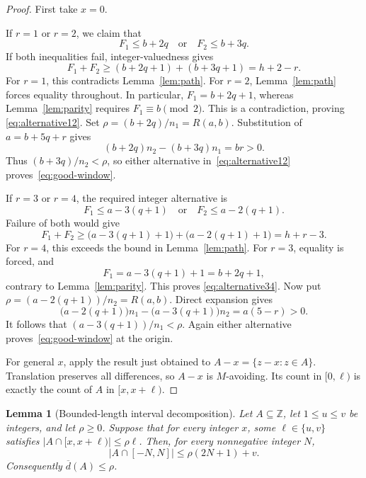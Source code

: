 \documentclass[11pt]{article}
\newtheorem{lemma}[theorem]{Lemma}
\theoremstyle{remark}
\newcommand{\Z}{\mathbb Z}
\newcommand{\ud}{\overline d}
\begin{document}
\begin{proof}
First take \(x=0\).

If \(r=1\) or \(r=2\), we claim that
\begin{equation}\label{eq:alternative12}
 F_1\le b+2q\quad\text{or}\quad F_2\le b+3q.
\end{equation}
If both inequalities fail, integer-valuedness gives
\[
 F_1+F_2\ge(b+2q+1)+(b+3q+1)=h+2-r.
\]
For \(r=1\), this contradicts Lemma~\ref{lem:path}. For \(r=2\),
Lemma~\ref{lem:path} forces equality throughout. In particular,
\(F_1=b+2q+1\), whereas Lemma~\ref{lem:parity} requires
\(F_1\equiv b\pmod2\). This is a contradiction, proving
\eqref{eq:alternative12}. Set \(\rho=(b+2q)/n_1=R(a,b)\).
Substitution of \(a=b+5q+r\) gives
\begin{equation}\label{eq:cross12}
 (b+2q)n_2-(b+3q)n_1=br>0.
\end{equation}
Thus \((b+3q)/n_2<\rho\), so either alternative
in~\eqref{eq:alternative12} proves~\eqref{eq:good-window}.

If \(r=3\) or \(r=4\), the required integer alternative is
\begin{equation}\label{eq:alternative34}
 F_1\le a-3(q+1)\quad\text{or}\quad F_2\le a-2(q+1).
\end{equation}
Failure of both would give
\[
 F_1+F_2\ge\bigl(a-3(q+1)+1\bigr)
                +\bigl(a-2(q+1)+1\bigr)=h+r-3.
\]
For \(r=4\), this exceeds the bound in Lemma~\ref{lem:path}.
For \(r=3\), equality is forced, and
\[
 F_1=a-3(q+1)+1=b+2q+1,
\]
contrary to Lemma~\ref{lem:parity}. This proves
\eqref{eq:alternative34}. Now put
\(\rho=(a-2(q+1))/n_2=R(a,b)\). Direct expansion gives
\begin{equation}\label{eq:cross34}
 \bigl(a-2(q+1)\bigr)n_1-
 \bigl(a-3(q+1)\bigr)n_2=a(5-r)>0.
\end{equation}
It follows that \((a-3(q+1))/n_1<\rho\). Again either alternative
proves~\eqref{eq:good-window} at the origin.

For general \(x\), apply the result just obtained to
\(A-x=\{z-x:z\in A\}\). Translation preserves all differences,
so \(A-x\) is \(M\)-avoiding. Its count in \([0,\ell)\) is
exactly the count of \(A\) in \([x,x+\ell)\).
\end{proof}

\begin{lemma}[Bounded-length interval decomposition]\label{lem:global}
Let \(A\subseteq\Z\), let \(1\le u\le v\) be integers, and let
\(\rho\ge0\). Suppose that for every integer \(x\), some
\(\ell\in\{u,v\}\) satisfies
\(|A\cap[x,x+\ell)|\le\rho\ell\).
Then, for every nonnegative integer \(N\),
\begin{equation}\label{eq:finite-global}
 |A\cap[-N,N]|\le\rho(2N+1)+v.
\end{equation}
Consequently \(\ud(A)\le\rho\).
\end{lemma}
\end{document}
